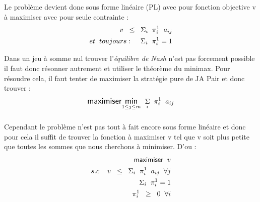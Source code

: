 \documentclass[a4paper, 12pt, twoside]{article}
\begin{document}
{{Le problème devient donc sous forme linéaire (PL) avec pour fonction objective \textsf{v} à maximiser avec pour seule contrainte : 
\begin{align*}
\large{v \hspace{0.2 cm} \leq  \hspace{0.2 cm}\Sigma_{i}\hspace{0.2 cm} \pi_{i}^{1}\hspace{0.2 cm} a _{ij}} \\ et \hspace{0,2 cm} toujours : \hspace{0,4 cm}
\large{\Sigma_{i} \hspace{0.2 cm} \pi_{i}^{1} = 1}
\end{align*}{Dans un jeu à somme nul trouver l'\textit{équilibre de Nash} n'est pas forcement possible il faut donc résonner autrement et utiliser le théorème du \textsf{minimax}. Pour résoudre cela, il faut tenter de maximiser la stratégie pure de \textsf{JA} \textsf{Pair} et donc trouver : \newline
\begin{align*}
 \large {\textsf{maximiser} \underset{1 \leq j \leq m}{\textsf{min}} \hspace{0,2cm}  \underset{i}{\Sigma} \hspace{0,2cm} \pi_{i}^{1} \hspace{0,2cm}  a _{ij} }  
\end{align*}
\subparagraph*{}{Cependant le problème n'est pas tout à fait encore sous forme linéaire et donc pour cela il suffit de trouver la fonction à maximiser \textsf{v} tel que \textsf{v} soit plus petite  que toutes les sommes que nous cherchons à minimiser. D'ou :} 
\begin{align*}
\textsf{maximiser} \hspace{0,2 cm} v \\ 
 s.c \hspace{0.4 cm} v \hspace{0,2 cm} \leq  \hspace{0.2 cm}\Sigma_{i}\hspace{0.2 cm} \pi_{i}^{1}\hspace{0.2 cm} a _{ij} \hspace{0,2 cm} \forall j\\
\Sigma_{i} \hspace{0.2 cm} \pi_{i}^{1} = 1 \\ 
\pi_{i}^{1} \hspace{0,2 cm} \geq \hspace{0,2 cm} 0 \hspace{0,2 cm} \forall i 
\end{align*}

}}}
\end{document}
